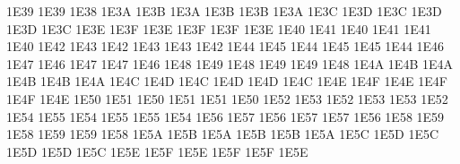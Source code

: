 \setcclcuc 1E39 1E39 1E38 %
\setcclcuc 1E3A 1E3B 1E3A %
\setcclcuc 1E3B 1E3B 1E3A %
\setcclcuc 1E3C 1E3D 1E3C %
\setcclcuc 1E3D 1E3D 1E3C %
\setcclcuc 1E3E 1E3F 1E3E %
\setcclcuc 1E3F 1E3F 1E3E %
\setcclcuc 1E40 1E41 1E40 %
\setcclcuc 1E41 1E41 1E40 %
\setcclcuc 1E42 1E43 1E42 %
\setcclcuc 1E43 1E43 1E42 %
\setcclcuc 1E44 1E45 1E44 %
\setcclcuc 1E45 1E45 1E44 %
\setcclcuc 1E46 1E47 1E46 %
\setcclcuc 1E47 1E47 1E46 %
\setcclcuc 1E48 1E49 1E48 %
\setcclcuc 1E49 1E49 1E48 %
\setcclcuc 1E4A 1E4B 1E4A %
\setcclcuc 1E4B 1E4B 1E4A %
\setcclcuc 1E4C 1E4D 1E4C %
\setcclcuc 1E4D 1E4D 1E4C %
\setcclcuc 1E4E 1E4F 1E4E %
\setcclcuc 1E4F 1E4F 1E4E %
\setcclcuc 1E50 1E51 1E50 %
\setcclcuc 1E51 1E51 1E50 %
\setcclcuc 1E52 1E53 1E52 %
\setcclcuc 1E53 1E53 1E52 %
\setcclcuc 1E54 1E55 1E54 %
\setcclcuc 1E55 1E55 1E54 %
\setcclcuc 1E56 1E57 1E56 %
\setcclcuc 1E57 1E57 1E56 %
\setcclcuc 1E58 1E59 1E58 %
\setcclcuc 1E59 1E59 1E58 %
\setcclcuc 1E5A 1E5B 1E5A %
\setcclcuc 1E5B 1E5B 1E5A %
\setcclcuc 1E5C 1E5D 1E5C %
\setcclcuc 1E5D 1E5D 1E5C %
\setcclcuc 1E5E 1E5F 1E5E %
\setcclcuc 1E5F 1E5F 1E5E %
